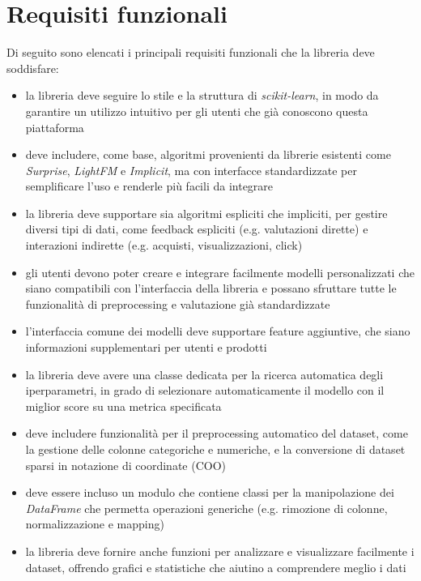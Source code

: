 \section{Requisiti funzionali}

Di seguito sono elencati i principali requisiti funzionali che la libreria deve soddisfare:

\begin{itemize}
    \item la libreria deve seguire lo stile e la struttura di \textit{scikit-learn}, in modo da garantire un utilizzo intuitivo per gli utenti che già conoscono questa piattaforma
    \item deve includere, come base, algoritmi provenienti da librerie esistenti come \textit{Surprise}, \textit{LightFM} e \textit{Implicit}, ma con interfacce standardizzate per semplificare l'uso e renderle più facili da integrare
    \item la libreria deve supportare sia algoritmi espliciti che impliciti, per gestire diversi tipi di dati, come feedback espliciti (e.g. valutazioni dirette) e interazioni indirette (e.g. acquisti, visualizzazioni, click)
    \item gli utenti devono poter creare e integrare facilmente modelli personalizzati che siano compatibili con l'interfaccia della libreria e possano sfruttare tutte le funzionalità di preprocessing e valutazione già standardizzate
    \item l'interfaccia comune dei modelli deve supportare feature aggiuntive, che siano informazioni supplementari per utenti e prodotti
    \item la libreria deve avere una classe dedicata per la ricerca automatica degli iperparametri, in grado di selezionare automaticamente il modello con il miglior score su una metrica specificata
    \item deve includere funzionalità per il preprocessing automatico del dataset, come la gestione delle colonne categoriche e numeriche, e la conversione di dataset sparsi in notazione di coordinate (COO)
    \item deve essere incluso un modulo che contiene classi per la manipolazione dei \textit{DataFrame} che permetta operazioni generiche (e.g. rimozione di colonne, normalizzazione e mapping)
    \item la libreria deve fornire anche funzioni per analizzare e visualizzare facilmente i dataset, offrendo grafici e statistiche che aiutino a comprendere meglio i dati
\end{itemize}

